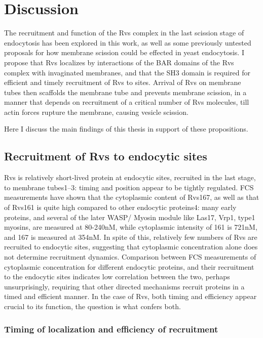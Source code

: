 
\chapter{Discussion}    
\label{Ch:discussion}

The recruitment and function of the Rvs complex in the last scission stage of endocytosis has been explored in this work, as well as some previously untested proposals for how membrane scission could be effected in yeast endocytosis. 
I propose that Rvs localizes by interactions of the BAR domains of the Rvs complex with invaginated membranes, and that the SH3 domain is required for efficient and timely recruitment of Rvs to sites. Arrival of Rvs on membrane tubes then scaffolds the membrane tube and prevents membrane scission, in a manner that depends on recruitment of a critical number of Rvs molecules, till actin forces rupture the membrane, causing vesicle scission. 

Here I discuss the main findings of this thesis in support of these propositions.

\section{Recruitment of Rvs to endocytic sites}
Rvs is relatively short-lived protein at endocytic sites, recruited in the last stage, to membrane tubes1–3: timing and position appear to be tightly regulated. FCS measurements have shown that the cytoplasmic content of Rvs167, as well as that of Rvs161 is quite high compared to other endocytic proteins4: many early proteins, and several of the later WASP/ Myosin module like Las17, Vrp1, type1 myosins, are measured at 80-240nM, while cytoplasmic intensity of 161 is 721nM, and 167 is measured at 354nM. In spite of this, relatively few numbers of Rvs are recruited to endocytic sites, suggesting that cytoplasmic concentration alone does not determine recruitment dynamics. Comparison between FCS measurements of cytoplasmic concentration for different endocytic proteins, and their recruitment to the endocytic sites indicates low correlation between the two, perhaps unsurprisingly, requiring that other directed mechanisms recruit proteins in a timed and efficient manner. In the case of Rvs, both timing and efficiency appear crucial to its function, the question is what confers both.  

\subsection{Timing of localization and efficiency of recruitment}

